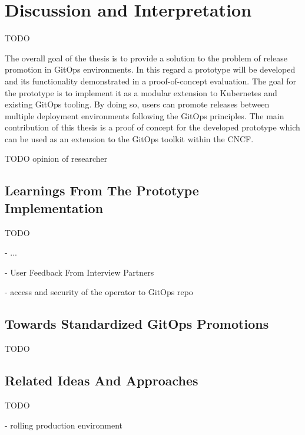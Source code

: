 \chapter{Discussion and Interpretation}
\label{discussion-and-interpretation}


TODO

The overall goal of the thesis is to
provide a solution to the problem of release promotion in GitOps environments.
In this regard a prototype will be developed
and its functionality demonstrated in a proof-of-concept evaluation.
The goal for the prototype is to implement it as a modular extension to Kubernetes
and existing GitOps tooling.
By doing so, users can promote releases between multiple deployment environments
following the GitOps principles.
The main contribution of this thesis is a proof of concept for the developed prototype
which can be used as an extension to the GitOps toolkit within the CNCF.






{\color{red}TODO opinion of researcher}



\section{Learnings From The Prototype Implementation}

TODO

- ...

- User Feedback From Interview Partners

- access and security of the operator to GitOps repo








\section{Towards Standardized GitOps Promotions}

TODO






\section{Related Ideas And Approaches}

TODO

- rolling production environment

